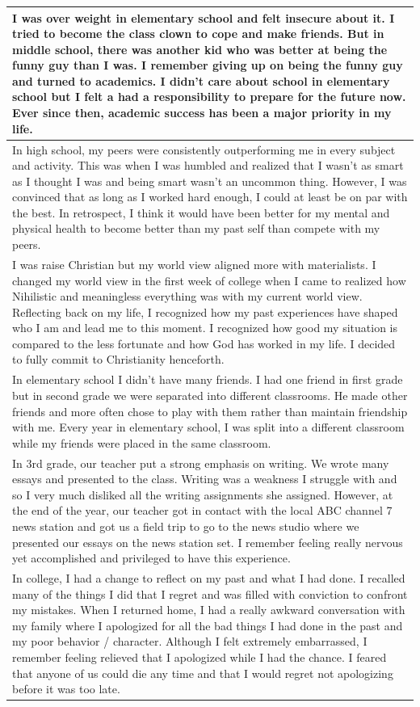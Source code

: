 \documentclass[
  .7em,
  letterpaper,
  DIV=11,
  numbers=noendperiod]{scrartcl}
\begin{document}
\begin{table}
\begin{tabular}{l}
\hline
I was over weight in elementary school and felt insecure about it. I tried to become the class clown to cope and make friends. But in middle school, there was another kid who was better at being the funny guy than I was. I remember giving up on being the funny guy and turned to academics. I didn’t care about school in elementary school but I felt a had a responsibility to prepare for the future now. Ever since then, academic success has been a major priority in my life.\\
\hline
In high school, my peers were consistently outperforming me in every subject and activity. This was when I was humbled and realized that I wasn’t as smart as I thought I was and being smart wasn’t an uncommon thing. However, I was convinced that as long as I worked hard enough, I could at least be on par with the best. In retrospect, I think it would have been better for my mental and physical health to become better than my past self than compete with my peers.\\
\hline
I was raise Christian but my world view aligned more with materialists. I changed my world view in the first week of college when I came to realized how Nihilistic and meaningless everything was with my current world view. Reflecting back on my life, I recognized how my past experiences have shaped who I am and lead me to this moment. I recognized how good my situation is compared to the less fortunate and how God has worked in my life. I decided to fully commit to Christianity henceforth.\\
\hline
In elementary school I didn’t have many friends. I had one friend in first grade but in second grade we were separated into different classrooms. He made other friends and more often chose to play with them rather than maintain friendship with me. Every year in elementary school, I was split into a different classroom while my friends were placed in the same classroom.\\
\hline
In 3rd grade, our teacher put a strong emphasis on writing. We wrote many essays and presented to the class. Writing was a weakness I struggle with and so I very much disliked all the writing assignments she assigned. However, at the end of the year, our teacher got in contact with the local ABC channel 7 news station and got us a field trip to go to the news studio where we presented our essays on the news station set. I remember feeling really nervous yet accomplished and privileged to have this experience.\\
\hline
In college, I had a change to reflect on my past and what I had done. I recalled many of the things I did that I regret and was filled with conviction to confront my mistakes. When I returned home, I had a really awkward conversation with my family where I apologized for all the bad things I had done in the past and my poor behavior / character. Although I felt extremely embarrassed, I remember feeling relieved that I apologized while I had the chance. I feared that anyone of us could die any time and that I would regret not apologizing before it was too late.\\

\end{tabular}
\end{table}
\end{document}
